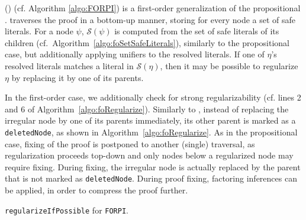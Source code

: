 {\FirstOrderRPI} ({\FORPI}) (cf. Algorithm \ref{algo:FORPI}) is a first-order generalization of the propositional {\RPI}.
{\FORPI} traverses the proof in a bottom-up manner, storing for every node a set of safe literals. 
For a node $\psi$, $\mathcal{S}(\psi)$ is computed from the set of safe literals of its children (cf.\ Algorithm~\ref{algo:foSetSafeLiterals}), similarly to the propositional case, but additionally applying unifiers to the resolved literals.
If one of $\eta$'s resolved literals matches a literal in $\mathcal{S}(\eta)$, then it may be possible to regularize $\eta$ by replacing it by one of its parents.  






In the first-order case, we additionally check for strong regularizability (cf. lines 2 and 6 of Algorithm~\ref{algo:foRegularize}).
Similarly to {\RPI}, instead of replacing the irregular node by one of its parents immediately, 
its other parent is marked as a \texttt{deletedNode}, as shown in Algorithm~\ref{algo:foRegularize}.
As in the propositional case, fixing of the proof is postponed to another (single) traversal, as regularization proceeds top-down and only nodes below a regularized node may require fixing.
During fixing, the irregular node is actually replaced by the parent that is not marked as \texttt{deletedNode}. During proof fixing, factoring inferences can be applied, in order to compress the proof further.

\IncMargin{0.5em}
\begin{algorithm}[bt]
\begin{scriptsize}



\BlankLine
    \uIf{$\exists \sigma$  and $\ell \in \mathcal{S}(\psi)$ such that $\ell = \ell_R\sigma_R\sigma$}{
     \uIf{$\psi_R\sigma_R\sigma \subseteq \mathcal{S}(\psi)$} {
      mark $\psi_L$ as \texttt{deletedNode} \;
      mark $\psi$ as regularized
}
    }
    \ElseIf{$\exists \sigma$  and $\ell \in \mathcal{S}(\psi)$ such that $\ell = \ell_L\sigma_L\sigma$ }{
     \uIf{$\psi_L\sigma_L\sigma \subseteq\mathcal{S}(\psi)$} {
      mark $\psi_R$ as \texttt{deletedNode} \;
      mark $\psi$ as regularized
}
    }
\caption{\label{algo:foRegularize} \texttt{regularizeIfPossible} for \texttt{FORPI}.}
\end{scriptsize}
\end{algorithm}
\DecMargin{0.5em}    

    





